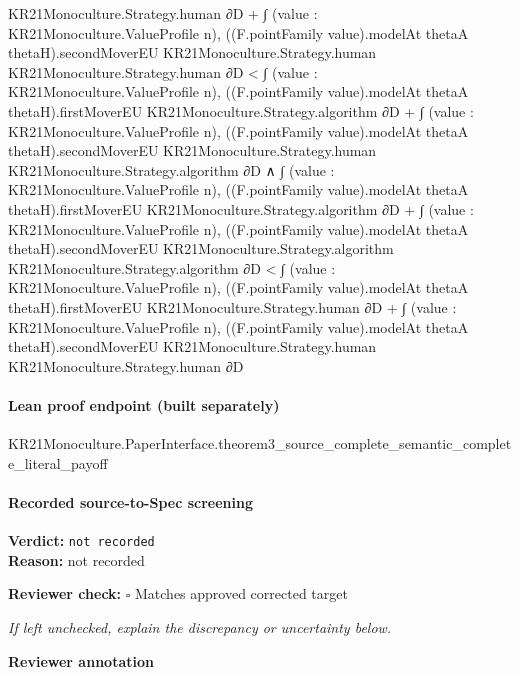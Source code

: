 \documentclass[10pt]{article}
\newcommand{\reviewerbox}{%
  \par\noindent\fbox{\parbox{0.96\linewidth}{\rule{0pt}{0.38in}}}\par
}
\newcommand{\reviewmatch}[1]{%
  \par\noindent\textbf{Reviewer check:} $\square$\; #1\par
  \noindent\emph{If left unchecked, explain the discrepancy or uncertainty below.}\par
}
\begin{document}
\begin{ReviewVerbatim}
                                    KR21Monoculture.Strategy.human ∂D +
                                ∫ (value : KR21Monoculture.ValueProfile n),
                                  ((F.pointFamily value).modelAt thetaA thetaH).secondMoverEU
                                    KR21Monoculture.Strategy.human KR21Monoculture.Strategy.human ∂D <
                              ∫ (value : KR21Monoculture.ValueProfile n),
                                  ((F.pointFamily value).modelAt thetaA thetaH).firstMoverEU
                                    KR21Monoculture.Strategy.algorithm ∂D +
                                ∫ (value : KR21Monoculture.ValueProfile n),
                                  ((F.pointFamily value).modelAt thetaA thetaH).secondMoverEU
                                    KR21Monoculture.Strategy.human KR21Monoculture.Strategy.algorithm ∂D ∧
                            ∫ (value : KR21Monoculture.ValueProfile n),
                                  ((F.pointFamily value).modelAt thetaA thetaH).firstMoverEU
                                    KR21Monoculture.Strategy.algorithm ∂D +
                                ∫ (value : KR21Monoculture.ValueProfile n),
                                  ((F.pointFamily value).modelAt thetaA thetaH).secondMoverEU
                                    KR21Monoculture.Strategy.algorithm KR21Monoculture.Strategy.algorithm ∂D <
                              ∫ (value : KR21Monoculture.ValueProfile n),
                                  ((F.pointFamily value).modelAt thetaA thetaH).firstMoverEU
                                    KR21Monoculture.Strategy.human ∂D +
                                ∫ (value : KR21Monoculture.ValueProfile n),
                                  ((F.pointFamily value).modelAt thetaA thetaH).secondMoverEU
                                    KR21Monoculture.Strategy.human KR21Monoculture.Strategy.human ∂D
\end{ReviewVerbatim}

\paragraph{Lean proof endpoint (built separately)}\begin{ReviewVerbatim}
KR21Monoculture.PaperInterface.theorem3_source_complete_semantic_complete_literal_payoff
\end{ReviewVerbatim}

\paragraph{Recorded source-to-Spec screening}
\textbf{Verdict:} \texttt{not recorded}
\\
\textbf{Reason:} not recorded
\reviewmatch{Matches approved corrected target}
\noindent\textbf{Reviewer annotation}\par
\reviewerbox
\clearpage
\hypertarget{source-claim-e42fc5562761542b}{}
\end{document}
